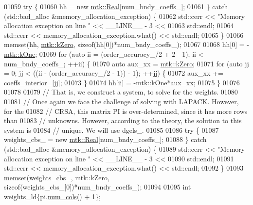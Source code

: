 \begin{DoxyCode}
{{01059   \textcolor{keywordflow}{try} \{
01060     hh = \textcolor{keyword}{new} \hyperlink{group__c01-roots_gac080bbbf5cbb5502c9f00405f894857d}{mtk::Real}[num\_bndy\_coeffs\_];
01061   \} \textcolor{keywordflow}{catch} (std::bad\_alloc &memory\_allocation\_exception) \{
01062     std::cerr << \textcolor{stringliteral}{"Memory allocation exception on line "} << \_\_LINE\_\_ - 3 <<
01063       std::endl;
01064     std::cerr << memory\_allocation\_exception.what() << std::endl;
01065   \}
01066   memset(hh, \hyperlink{group__c01-roots_ga59a451a5fae30d59649bcda274fea271}{mtk::kZero}, \textcolor{keyword}{sizeof}(hh[0])*num\_bndy\_coeffs\_);
01067 
01068   hh[0] = -\hyperlink{group__c01-roots_ga26407c24d43b6b95480943340d285c71}{mtk::kOne};
01069   \textcolor{keywordflow}{for} (\textcolor{keyword}{auto} ii = (order\_accuracy\_/2 + 2 - 1); ii < num\_bndy\_coeffs\_; ++ii) \{
01070     \textcolor{keyword}{auto} aux\_xx = \hyperlink{group__c01-roots_ga59a451a5fae30d59649bcda274fea271}{mtk::kZero};
01071     \textcolor{keywordflow}{for} (\textcolor{keyword}{auto} jj = 0; jj < ((ii - (order\_accuracy\_/2 - 1)) - 1); ++jj) \{
01072       aux\_xx += coeffs\_interior\_[jj];
01073     \}
01074     hh[ii] = -\hyperlink{group__c01-roots_ga26407c24d43b6b95480943340d285c71}{mtk::kOne}*aux\_xx;
01075   \}
01076 
01078 
01079   \textcolor{comment}{// That is, we construct a system, to solve for the weights.}
01080 
01081   \textcolor{comment}{// Once again we face the challenge of solving with LAPACK. However, for the}
01082   \textcolor{comment}{// CRSA, this matrix PI is over-determined, since it has more rows than}
01083   \textcolor{comment}{// unknowns. However, according to the theory, the solution to this system is}
01084   \textcolor{comment}{// unique. We will use dgels\_.}
01085 
01086   \textcolor{keywordflow}{try} \{
01087     weights\_cbs\_ = \textcolor{keyword}{new} \hyperlink{group__c01-roots_gac080bbbf5cbb5502c9f00405f894857d}{mtk::Real}[num\_bndy\_coeffs\_];
01088   \} \textcolor{keywordflow}{catch} (std::bad\_alloc &memory\_allocation\_exception) \{
01089     std::cerr << \textcolor{stringliteral}{"Memory allocation exception on line "} << \_\_LINE\_\_ - 3 <<
01090       std::endl;
01091     std::cerr << memory\_allocation\_exception.what() << std::endl;
01092   \}
01093   memset(weights\_cbs\_, \hyperlink{group__c01-roots_ga59a451a5fae30d59649bcda274fea271}{mtk::kZero}, \textcolor{keyword}{sizeof}(weights\_cbs\_[0])*num\_bndy\_coeffs\_);
01094 
01095   \textcolor{keywordtype}{int} weights\_ld\{pi.\hyperlink{classmtk_1_1DenseMatrix_a41747502d468c6728a4be31501b16e0e}{num\_cols}() + 1\};
}}
\end{DoxyCode}
